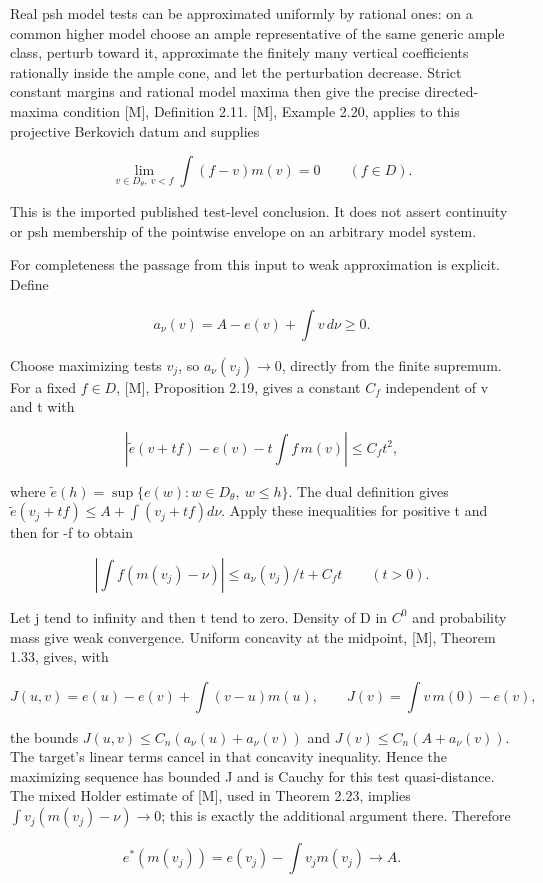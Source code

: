\documentclass[11pt]{article}
\begin{document}
Real psh model tests can be approximated uniformly by rational ones: on a common higher model choose an ample representative of the same generic ample class, perturb toward it, approximate the finitely many vertical coefficients rationally inside the ample cone, and let the perturbation decrease. Strict constant margins and rational model maxima then give the precise directed-maxima condition [M], Definition 2.11. [M], Example 2.20, applies to this projective Berkovich datum and supplies

\[
\lim_{v\in D_\theta,\ v<f}\int(f-v)m(v)=0\qquad(f\in D).
\]

This is the imported published test-level conclusion. It does not assert continuity or psh membership of the pointwise envelope on an arbitrary model system.

For completeness the passage from this input to weak approximation is explicit. Define

\[
a_\nu(v)=A-e(v)+\int v\,d\nu\geq0.
\]

Choose maximizing tests \(v_j\), so \(a_\nu(v_j)\to0\), directly from the finite supremum. For a fixed \(f\in D\), [M], Proposition 2.19, gives a constant \(C_f\) independent of v and t with

\[
\left|\widetilde e(v+tf)-e(v)-t\int f\,m(v)\right|\leq C_ft^2,
\]

where \(\widetilde e(h)=\sup\{e(w):w\in D_\theta,\ w\leq h\}\). The dual definition gives \(\widetilde e(v_j+tf)\leq A+\int(v_j+tf)d\nu\). Apply these inequalities for positive t and then for -f to obtain

\[
\left|\int f(m(v_j)-\nu)\right|
\leq a_\nu(v_j)/t+C_ft\qquad(t>0).
\]

Let j tend to infinity and then t tend to zero. Density of D in \(C^0\) and probability mass give weak convergence. Uniform concavity at the midpoint, [M], Theorem 1.33, gives, with

\[
J(u,v)=e(u)-e(v)+\int(v-u)m(u),\qquad
J(v)=\int v\,m(0)-e(v),
\]

the bounds \(J(u,v)\leq C_n(a_\nu(u)+a_\nu(v))\) and \(J(v)\leq C_n(A+a_\nu(v))\). The target's linear terms cancel in that concavity inequality. Hence the maximizing sequence has bounded J and is Cauchy for this test quasi-distance. The mixed Holder estimate of [M], used in Theorem 2.23, implies \(\int v_j(m(v_j)-\nu)\to0\); this is exactly the additional argument there. Therefore

\[
e^*(m(v_j))=e(v_j)-\int v_jm(v_j)\longrightarrow A.
\]
\end{document}
